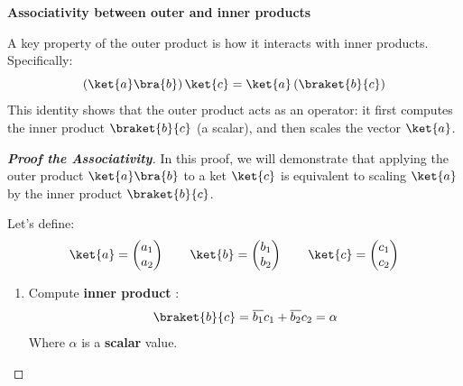 \highspace
\begin{flushleft}
    \textcolor{Green3}{ \textbf{Associativity between outer and inner products}}
\end{flushleft}
A key property of the outer product is how it interacts with inner products. Specifically:
\begin{equation}
    \left(\ket{a}\bra{b}\right) \ket{c} = \ket{a} \left( \braket{b}{c} \right)
\end{equation}
This identity shows that the outer product acts as an operator: it first computes the inner product $\braket{b}{c}$ (a scalar), and then scales the vector $\ket{a}$.

\begin{proof}[\textbf{Proof the Associativity}]
    In this proof, we will demonstrate that applying the outer product $\ket{a}\bra{b}$ to a ket $\ket{c}$ is equivalent to scaling $\ket{a}$ by the inner product $\braket{b}{c}$.

    \highspace
    Let's define:
    \begin{equation*}
        \ket{a} = \begin{pmatrix}
            a_{1} \\
            a_{2}
        \end{pmatrix}
        \hspace{2em}
        \ket{b} = \begin{pmatrix}
            b_{1} \\
            b_{2}
        \end{pmatrix}
        \hspace{2em}
        \ket{c} = \begin{pmatrix}
            c_{1} \\
            c_{2}
        \end{pmatrix}
    \end{equation*}
    \begin{enumerate}
        \item Compute \textbf{inner product} :
        \begin{equation*}
            \braket{b}{c} = \overline{b_{1}} c_{1} + \overline{b_{2}} c_{2} = \alpha
        \end{equation*}
        Where $\alpha$ is a \textbf{scalar} value.


\end{enumerate}
\end{proof}
